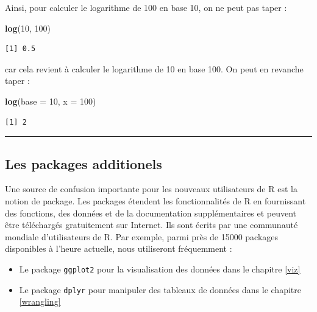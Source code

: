 \documentclass[a4paperpaper,]{article}
\newenvironment{Shaded}{\begin{snugshade}}{\end{snugshade}}
\newcommand{\DataTypeTok}[1]{\textcolor[rgb]{0.00,0.34,0.68}{#1}}
\newcommand{\DecValTok}[1]{\textcolor[rgb]{0.69,0.50,0.00}{#1}}
\newcommand{\KeywordTok}[1]{\textcolor[rgb]{0.12,0.11,0.11}{\textbf{#1}}}
\newcommand{\NormalTok}[1]{\textcolor[rgb]{0.12,0.11,0.11}{#1}}
\providecommand{\tightlist}{%
  \setlength{\itemsep}{0pt}\setlength{\parskip}{0pt}}
\begin{document}
Ainsi, pour calculer le logarithme de 100 en base 10, on ne peut pas taper :

\begin{Shaded}
\begin{Highlighting}[]
\KeywordTok{log}\NormalTok{(}\DecValTok{10}\NormalTok{, }\DecValTok{100}\NormalTok{)}
\end{Highlighting}
\end{Shaded}

\begin{verbatim}
[1] 0.5
\end{verbatim}

car cela revient à calculer le logarithme de 10 en base 100. On peut en revanche taper :

\begin{Shaded}
\begin{Highlighting}[]
\KeywordTok{log}\NormalTok{(}\DataTypeTok{base =} \DecValTok{10}\NormalTok{, }\DataTypeTok{x =} \DecValTok{100}\NormalTok{)}
\end{Highlighting}
\end{Shaded}

\begin{verbatim}
[1] 2
\end{verbatim}

\begin{center}\rule{0.5\linewidth}{\linethickness}\end{center}

\hypertarget{packages}{%
\subsection{Les packages additionels}\label{packages}}

Une source de confusion importante pour les nouveaux utilisateurs de R est la notion de package. Les packages étendent les fonctionnalités de R en fournissant des fonctions, des données et de la documentation supplémentaires et peuvent être téléchargés gratuitement sur Internet. Ils sont écrits par une communauté mondiale d'utilisateurs de R. Par exemple, parmi près de 15000 packages disponibles à l'heure actuelle, nous utiliseront fréquemment :

\begin{itemize}
\tightlist
\item
  Le package \texttt{ggplot2} pour la visualisation des données dans le chapitre \ref{viz}
\item
  Le package \texttt{dplyr} pour manipuler des tableaux de données dans le chapitre \ref{wrangling}
\end{itemize}
\end{document}
